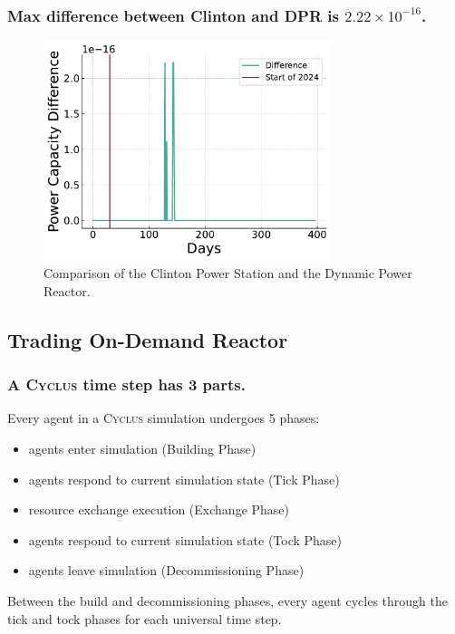 \documentclass[9pt]{beamer}
\newcommand{\cyclus}{\textsc{Cyclus}\xspace}
\begin{document}
\begin{frame}
  \frametitle{Max difference between Clinton and DPR is $2.22 \times 10^{-16}$.}
  \begin{figure}
    \centering
    \includegraphics[width=0.75\textwidth]{images/dpr_diff.pdf}
    \caption{Comparison of the Clinton Power Station and the Dynamic Power Reactor.}
  \end{figure}
\end{frame}


\subsection{Trading On-Demand Reactor}
\begin{frame}
  \frametitle{A \cyclus time step has 3 parts.}
  Every agent in a \cyclus simulation undergoes 5 phases:
  \begin{itemize}
    \item agents enter simulation (Building Phase)
    \item agents respond to current simulation state (Tick Phase)
    \item resource exchange execution (Exchange Phase)
    \item agents respond to current simulation state (Tock Phase)
    \item agents leave simulation (Decommissioning Phase)
  \end{itemize}
  Between the build and decommissioning phases, every agent cycles through the tick and tock phases for each universal time step.
\end{frame}


\end{document}
